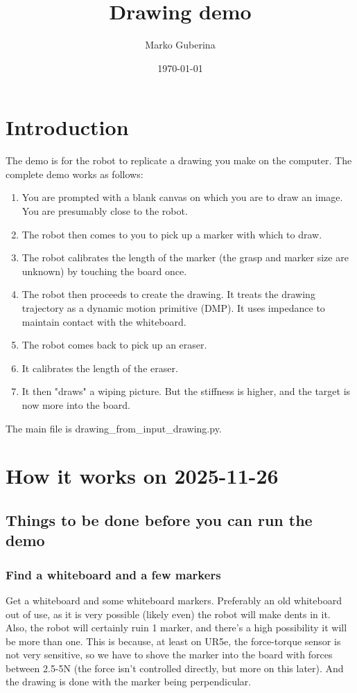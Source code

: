 \documentclass{article}
\title{Drawing demo}
\date{\today}
\author{Marko Guberina}
\begin{document}
\maketitle

\section{Introduction}
The demo is for the robot to replicate a drawing you make on the computer.
The complete demo works as follows:
\begin{enumerate}
		\item You are prompted with a blank canvas on which you are to draw an image.
				You are presumably close to the robot.
		\item The robot then comes to you to pick up a marker with which to draw.
		\item The robot calibrates the length of the marker (the grasp and marker size are unknown)
				by touching the board once.
		\item The robot then proceeds to create the drawing. It treats the drawing trajectory
				as a dynamic motion primitive (DMP). 
				It uses impedance to maintain contact with the whiteboard.
		\item The robot comes back to pick up an eraser.
		\item It calibrates the length of the eraser.
		\item It then "draws" a wiping picture. But the stiffness is higher, 
				and the target is now more into the board.
\end{enumerate}

The main file is drawing\_from\_input\_drawing.py.

\section{How it works on 2025-11-26}
\subsection{Things to be done before you can run the demo}
\subsubsection{Find a whiteboard and a few markers}
Get a whiteboard and some whiteboard markers. Preferably an old whiteboard out of use,
as it is very possible (likely even) the robot will make dents in it.
Also, the robot will certainly ruin 1 marker, and there's a high possibility it will be more than one.
This is because, at least on UR5e, the force-torque sensor is not very sensitive,
so we have to shove the marker into the board with forces between 2.5-5N (the force isn't controlled directly,
but more on this later). 
And the drawing is done with the marker being perpendicular.
\end{document}
